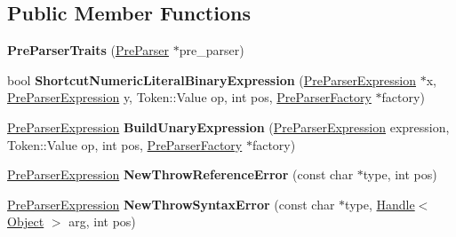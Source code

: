 \subsection*{Public Member Functions}
\begin{DoxyCompactItemize}
\item 
\hypertarget{classv8_1_1internal_1_1_pre_parser_traits_a9a1be2b87e3ebd1a07da40f4f1b475c6}{}{\bfseries Pre\+Parser\+Traits} (\hyperlink{classv8_1_1internal_1_1_pre_parser}{Pre\+Parser} $\ast$pre\+\_\+parser)\label{classv8_1_1internal_1_1_pre_parser_traits_a9a1be2b87e3ebd1a07da40f4f1b475c6}

\item 
\hypertarget{classv8_1_1internal_1_1_pre_parser_traits_a57a3afb92d382d46fceffbf0ba64e75c}{}bool {\bfseries Shortcut\+Numeric\+Literal\+Binary\+Expression} (\hyperlink{classv8_1_1internal_1_1_pre_parser_expression}{Pre\+Parser\+Expression} $\ast$x, \hyperlink{classv8_1_1internal_1_1_pre_parser_expression}{Pre\+Parser\+Expression} y, Token\+::\+Value op, int pos, \hyperlink{classv8_1_1internal_1_1_pre_parser_factory}{Pre\+Parser\+Factory} $\ast$factory)\label{classv8_1_1internal_1_1_pre_parser_traits_a57a3afb92d382d46fceffbf0ba64e75c}

\item 
\hypertarget{classv8_1_1internal_1_1_pre_parser_traits_abe09fcdfe8b1fa21bb07d64d7cb022cb}{}\hyperlink{classv8_1_1internal_1_1_pre_parser_expression}{Pre\+Parser\+Expression} {\bfseries Build\+Unary\+Expression} (\hyperlink{classv8_1_1internal_1_1_pre_parser_expression}{Pre\+Parser\+Expression} expression, Token\+::\+Value op, int pos, \hyperlink{classv8_1_1internal_1_1_pre_parser_factory}{Pre\+Parser\+Factory} $\ast$factory)\label{classv8_1_1internal_1_1_pre_parser_traits_abe09fcdfe8b1fa21bb07d64d7cb022cb}

\item 
\hypertarget{classv8_1_1internal_1_1_pre_parser_traits_afede22ec67127dd0462bb1810b30b29c}{}\hyperlink{classv8_1_1internal_1_1_pre_parser_expression}{Pre\+Parser\+Expression} {\bfseries New\+Throw\+Reference\+Error} (const char $\ast$type, int pos)\label{classv8_1_1internal_1_1_pre_parser_traits_afede22ec67127dd0462bb1810b30b29c}

\item 
\hypertarget{classv8_1_1internal_1_1_pre_parser_traits_a6cbf3e77d4dcf19a67e2826492addf72}{}\hyperlink{classv8_1_1internal_1_1_pre_parser_expression}{Pre\+Parser\+Expression} {\bfseries New\+Throw\+Syntax\+Error} (const char $\ast$type, \hyperlink{classv8_1_1internal_1_1_handle}{Handle}$<$ \hyperlink{classv8_1_1internal_1_1_object}{Object} $>$ arg, int pos)\label{classv8_1_1internal_1_1_pre_parser_traits_a6cbf3e77d4dcf19a67e2826492addf72}


\end{DoxyCompactItemize}
